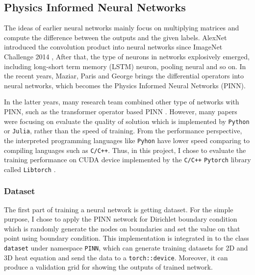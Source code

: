 \subsection{Physics Informed Neural Networks}
The ideas of earlier neural networks mainly focus on multiplying matrices and compute the difference between the outputs and the given labels.
AlexNet introduced the convolution product into neural networks since ImageNet Challenge 2014 
                \cite{CNN}, 
After that, the type of neurons in networks explosively emerged, including long-short term memory (LSTM) neuron, pooling neural and so on.
In the recent years, Maziar, Paris and George 
                \cite{PINN}
brings the differential operators into neural networks, which becomes the Physics Informed Neural Networks (PINN).

In the latter years, many research team combined other type of networks with PINN, such as the transformer operator based PINN 
                \cite{Transformer_PINN}.
However, many papers were focusing on evaluate the quality of solution which is implemented by \texttt{Python} or \texttt{Julia}, rather than the speed of training.
From the performance perspective, the interpreted programming languages like \texttt{Pyhon} have lower speed comparing to compiling languages such as \texttt{C/C++}.
Thus, in this project, I chose to evaluate the training performance on CUDA device implemented by the \texttt{C/C++} \texttt{Pytorch} library called \texttt{Libtorch} 
\cite{Libtorch}.


\subsubsection{Dataset}
The first part of training a neural network is getting dataset. 
For the simple purpose, I chose to apply the PINN network for Dirichlet boundary condition which is 
randomly generate the nodes on boundaries and set the value on that point using boundary condition.
This implementation is integrated in to the class \texttt{dataset} under namespace \texttt{PINN},
which can generate training datasets for 2D and 3D heat equation and send the data to a \texttt{torch::device}.
Moreover, it can produce a validation grid for showing the outputs of trained network.

